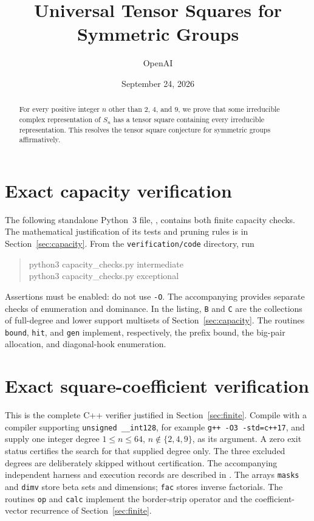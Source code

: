 \documentclass[11pt]{article}
\title{Universal Tensor Squares for Symmetric Groups}
\author{OpenAI}
\date{September 24, 2026}
\numberwithin{equation}{section}
\theoremstyle{definition}
\theoremstyle{remark}
\begin{document}
\maketitle
\begin{abstract}
For every positive integer $n$ other than $2$, $4$, and $9$, we prove that
some irreducible complex representation of $S_n$ has a tensor square
containing every irreducible representation. This resolves the tensor
square conjecture for symmetric groups affirmatively.
\end{abstract}
\tableofcontents
\clearpage








\appendix
\section{Exact capacity verification}
\label{app:capacity-code}
The following standalone Python~3 file, ,
contains both finite capacity checks.
The mathematical justification of its tests and pruning rules is in
Section~\ref{sec:capacity}. From the \texttt{verification/code} directory, run
\begin{quote}\ttfamily
python3 capacity\_checks.py intermediate\\
python3 capacity\_checks.py exceptional
\end{quote}
Assertions must be enabled: do not use \texttt{-O}.
The accompanying  provides separate
checks of enumeration and dominance.
In the listing, \texttt{B} and \texttt{C} are the collections of full-degree
and lower support multisets of Section~\ref{sec:capacity}. The routines
\texttt{bound}, \texttt{hit}, and \texttt{gen} implement, respectively,
the prefix bound, the big-pair allocation, and diagonal-hook enumeration.

\section{Exact square-coefficient verification}
\label{app:smallcode}
This is the complete C++ verifier justified in Section~\ref{sec:finite}.
Compile with a compiler supporting \texttt{unsigned \_\_int128}, for example
\texttt{g++ -O3 -std=c++17}, and supply one integer degree
$1\le n\le64$, $n\notin\{2,4,9\}$, as its argument.
A zero exit status certifies the search for that supplied degree only.
The three excluded degrees are deliberately skipped without certification.
The accompanying
independent harness and execution records are described in
.
The arrays \texttt{masks} and \texttt{dimv} store beta sets and dimensions;
\texttt{fac} stores inverse factorials. The routines \texttt{op} and
\texttt{calc} implement the border-strip operator and the coefficient-vector
recurrence of Section~\ref{sec:finite}.


\end{document}
